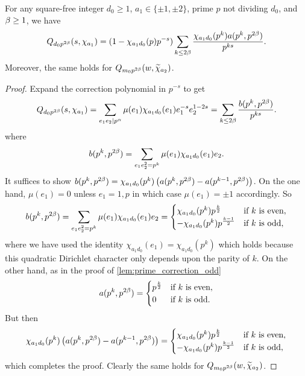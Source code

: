\documentclass[12pt,reqno,oneside]{amsart}
\begin{document}
    \begin{lemma}\label{lem:prime_correction_even}
        For any square-free integer $d_{0} \ge 1$, $a_{1} \in \{\pm1,\pm2\}$, prime $p$ not dividing $d_{0}$, and $\beta \ge 1$, we have
        \[
            Q_{d_{0}p^{2\beta}}(s,\chi_{a_{1}}) = (1-\chi_{a_{1}d_{0}}(p)p^{-s})\sum_{k \le 2\beta}\frac{\chi_{a_{1}d_{0}}(p^{k})a(p^{k},p^{2\beta})}{p^{ks}}.
        \]
        Moreover, the same holds for $Q_{m_{0}p^{2\beta}}(w,\widetilde{\chi}_{a_{2}})$.
    \end{lemma}
    \begin{proof}
        Expand the correction polynomial in $p^{-s}$ to get
        \[
            Q_{d_{0}p^{2\beta}}(s,\chi_{a_{1}}) = \sum_{e_{1}e_{2} \mid p^{\alpha}}\mu(e_{1})\chi_{a_{1}d_{0}}(e_{1})e_{1}^{-s}e_{2}^{1-2s} = \sum_{k \le 2\beta}\frac{b(p^{k},p^{2\beta})}{p^{ks}}.
        \]
        where
        \[
            b(p^{k},p^{2\beta}) = \sum_{e_{1}e_{2}^{2} = p^{k}}\mu(e_{1})\chi_{a_{1}d_{0}}(e_{1})e_{2}.
        \]
        It suffices to show $b(p^{k},p^{2\beta}) = \chi_{a_{1}d_{0}}(p^{k})\left(a(p^{k},p^{2\beta})-a(p^{k-1},p^{2\beta})\right)$. On the one hand, $\mu(e_{1}) = 0$ unless $e_{1} = 1,p$ in which case $\mu(e_{1}) = \pm1$ accordingly. So
        \[
            b(p^{k},p^{2\beta}) = \sum_{e_{1}e_{2}^{2} = p^{k}}\mu(e_{1})\chi_{a_{1}d_{0}}(e_{1})e_{2} = \begin{cases} \chi_{a_{1}d_{0}}(p^{k})p^{\frac{k}{2}} & \text{if $k$ is even}, \\ -\chi_{a_{1}d_{0}}(p^{k})p^{\frac{k-1}{2}} & \text{if $k$ is odd}, \end{cases}
        \]
        where we have used the identity $\chi_{a_{1}d_{0}}(e_{1}) = \chi_{a_{1}d_{0}}(p^{k})$ which holds because this quadratic Dirichlet character only depends upon the parity of $k$. On the other hand, as in the proof of \cref{lem:prime_correction_odd} 
        \[
            a(p^{k},p^{2\beta}) = \begin{cases} p^{\frac{k}{2}} & \text{if $k$ is even}, \\ 0 & \text{if $k$ is odd}. \end{cases}
        \]
        But then
        \[
            \chi_{a_{1}d_{0}}(p^{k})\left(a(p^{k},p^{2\beta})-a(p^{k-1},p^{2\beta})\right) = \begin{cases} \chi_{a_{1}d_{0}}(p^{k})p^{\frac{k}{2}} & \text{if $k$ is even}, \\ -\chi_{a_{1}d_{0}}(p^{k})p^{\frac{k-1}{2}} & \text{if $k$ is odd}, \end{cases}
        \]
        which completes the proof. Clearly the same holds for $Q_{m_{0}p^{2\beta}}(w,\widetilde{\chi}_{a_{2}})$.
    \end{proof}
\end{document}
